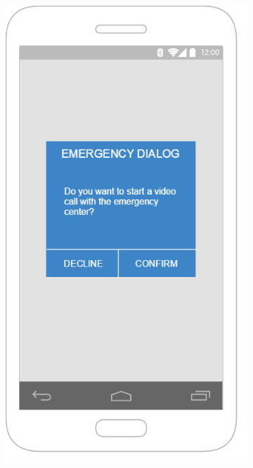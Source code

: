 \documentclass{article}
\begin{document}
	\begin{figure}
\centering
\begin{subfigure}{.5\textwidth}
  \centering
  \includegraphics[width=.9\linewidth]{"VideoStream/6"}
  

\end{subfigure}
\end{figure}
\end{document}
